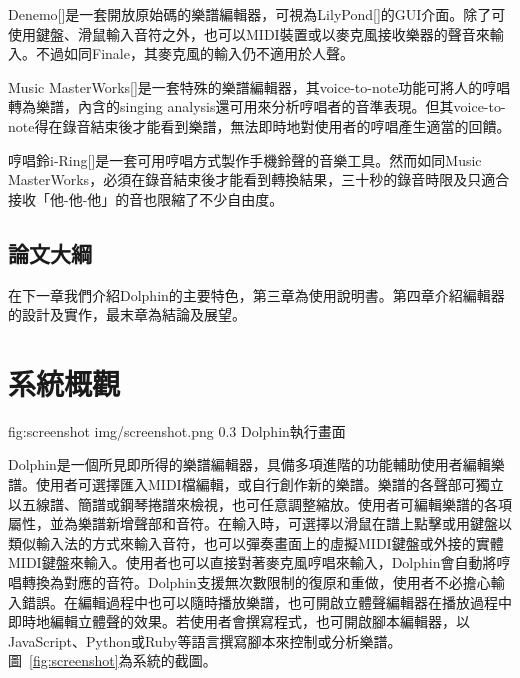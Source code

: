 \documentclass[12pt,a4paper,oneside]{report}
\begin{document}
Denemo[]是一套開放原始碼的樂譜編輯器，可視為LilyPond[]的GUI介面。除了可使用鍵盤、滑鼠輸入音符之外，也可以MIDI裝置或以麥克風接收樂器的聲音來輸入。不過如同Finale，其麥克風的輸入仍不適用於人聲。

Music MasterWorks[]是一套特殊的樂譜編輯器，其voice-to-note功能可將人的哼唱轉為樂譜，內含的singing analysis還可用來分析哼唱者的音準表現。但其voice-to-note得在錄音結束後才能看到樂譜，無法即時地對使用者的哼唱產生適當的回饋。

哼唱鈴i-Ring[]是一套可用哼唱方式製作手機鈴聲的音樂工具。然而如同Music MasterWorks，必須在錄音結束後才能看到轉換結果，三十秒的錄音時限及只適合接收「他-他-他」的音也限縮了不少自由度。

\section{論文大綱} %

在下一章我們介紹Dolphin的主要特色，第三章為使用說明書。第四章介紹編輯器的設計及實作，最末章為結論及展望。

\chapter{系統概觀} %


\figurewithcaption
{fig:screenshot}
{img/screenshot.png}
{0.3}
{Dolphin執行畫面}

Dolphin是一個所見即所得的樂譜編輯器，具備多項進階的功能輔助使用者編輯樂譜。使用者可選擇匯入MIDI檔編輯，或自行創作新的樂譜。樂譜的各聲部可獨立以五線譜、簡譜或鋼琴捲譜來檢視，也可任意調整縮放。使用者可編輯樂譜的各項屬性，並為樂譜新增聲部和音符。在輸入時，可選擇以滑鼠在譜上點擊或用鍵盤以類似輸入法的方式來輸入音符，也可以彈奏畫面上的虛擬MIDI鍵盤或外接的實體MIDI鍵盤來輸入。使用者也可以直接對著麥克風哼唱來輸入，Dolphin會自動將哼唱轉換為對應的音符。Dolphin支援無次數限制的復原和重做，使用者不必擔心輸入錯誤。在編輯過程中也可以隨時播放樂譜，也可開啟立體聲編輯器在播放過程中即時地編輯立體聲的效果。若使用者會撰寫程式，也可開啟腳本編輯器，以JavaScript、Python或Ruby等語言撰寫腳本來控制或分析樂譜。圖~\ref{fig:screenshot}為系統的截圖。
\end{document}

